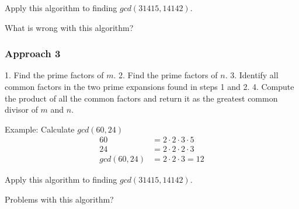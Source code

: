 \documentclass[12pt]{amsart}
\begin{document}
   Apply this algorithm to finding $gcd(31415, 14142)$.

   What is wrong with this algorithm?

\subsubsection{Approach 3}

   1. Find the prime factors of $m$.
   2. Find the prime factors of $n$.
   3. Identify all common factors in the two prime expansions found in
      steps 1 and 2.
   4. Compute the product of all the common factors and return it as
      the greatest common divisor of $m$ and $n$.

   Example: Calculate $gcd(60, 24)$
   \begin{align}
   60 &= 2 \cdot 2 \cdot 3 \cdot 5\\
   24 &= 2 \cdot 2 \cdot 2 \cdot 3\\
   gcd(60, 24) &= 2 \cdot 2 \cdot 3 = 12
   \end{align}

   Apply this algorithm to finding $gcd(31415, 14142)$.

   Problems with this algorithm?
\end{document}
